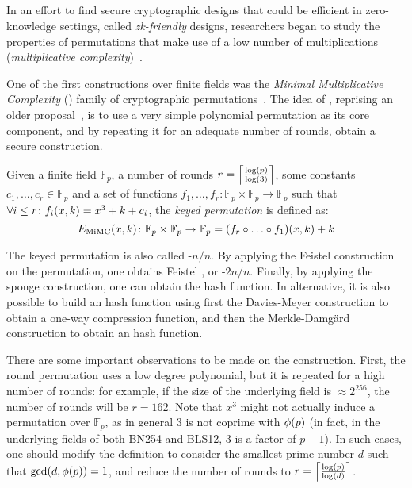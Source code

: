 \subsection{\Mimc}
In an effort to find secure cryptographic designs that could be efficient in zero-knowledge 
settings, called \emph{zk-friendly} designs, researchers began to study the properties of 
permutations that make use of a low number of multiplications 
(\emph{multiplicative complexity})~\cite{AlbrechtRSTZ2016}.

One of the first constructions over finite fields was the \emph{Minimal Multiplicative Complexity}
(\Mimc) family of cryptographic permutations~\cite{AlbrechtGRRT2016}.
The idea of \Mimc{}, reprising an older proposal~\cite{NybergK1995}, is to use a very simple 
polynomial permutation as its core component, and by repeating it for an adequate number of rounds,
obtain a secure construction.
\begin{definition}
  Given a finite field \(\mathbb{F}_p\), a number of rounds 
  \(r = \Ceil*{\frac{\call{\log}{p}}{\call{\log}{3}}}\), some constants 
  \(c_1, \dots, c_r \in \mathbb{F}_p\) and a set of functions 
  \(f_1, \dots, f_r\colon \mathbb{F}_p \times \mathbb{F}_p \to \mathbb{F}_p\) such that 
  \(\forall i \le r\colon \call{f_i}{x, k} = x^3 + k + c_i\), the \emph{\Mimc{} keyed permutation}
  is defined as:
  \[
    \call{E_{\Mimc}}{x, k}\colon \mathbb{F}_p \times \mathbb{F}_p \to \mathbb{F}_p = 
    \call{\Parens*{f_r \compose \dots \compose f_1}}{x, k} + k
  \]
\end{definition}

The \Mimc{} keyed permutation is also called \Mimc-\(n/n\). 
By applying the Feistel construction on the \Mimc{} permutation, one obtains Feistel \Mimc, 
or \Mimc-\(2n/n\).
Finally, by applying the sponge construction, one can obtain the \Mimchash{} hash function.
In alternative, it is also possible to build an hash function using first the Davies-Meyer 
construction to obtain a one-way compression function, and then the Merkle-Damg\"{a}rd construction
to obtain an hash function.

There are some important observations to be made on the \Mimc{} construction.
First, the round permutation uses a low degree polynomial, but it is repeated for a high number of 
rounds: for example, if the size of the underlying field is \(\approx 2^{256}\), the number of 
rounds will be \(r = 162\). 
Note that \(x^3\) might not actually induce a permutation over \(\mathbb{F}_p\), as in general 
\(3\) is not coprime with \(\call{\totient}{p}\) (in fact, in the underlying fields of both BN254 
and BLS12, \(3\) is a factor of \(p - 1\)).
In such cases, one should modify the definition to consider the smallest prime number \(d\) such 
that \(\call{\gcd}{d, \call{\totient}{p}} = 1\), and reduce the number of rounds to
\(r = \Ceil*{\frac{\call{\log}{p}}{\call{\log}{d}}}\).

